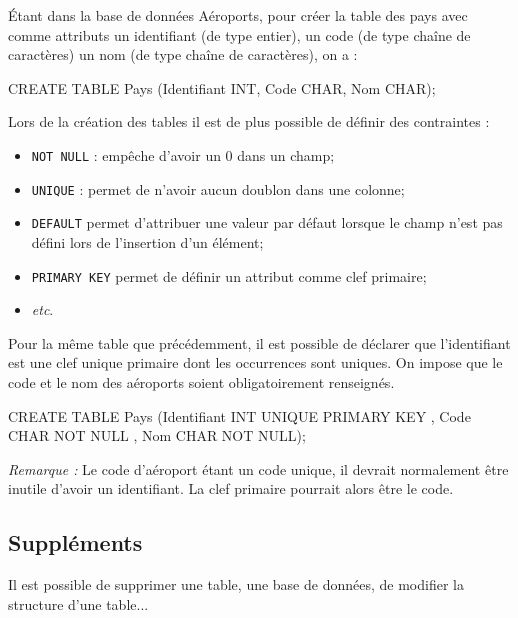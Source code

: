 \documentclass[10pt]{article}
\begin{document}
\begin{exemple}
Étant dans la base de données Aéroports, pour créer la table des pays avec comme attributs un identifiant (de type entier), un code (de type chaîne de caractères) un nom (de type chaîne de caractères), on a :
\begin{envsql}
\begin{sql}
CREATE TABLE Pays (Identifiant INT, Code CHAR, Nom CHAR);
\end{sql}
\end{envsql}

\end{exemple}

Lors de la création des tables il est de plus possible de définir des contraintes :
\begin{itemize}
\item \texttt{NOT NULL} : empêche d'avoir un 0 dans un champ;
\item \texttt{UNIQUE} : permet de n'avoir aucun doublon dans une colonne;
\item \texttt{DEFAULT} permet d'attribuer une valeur par défaut lorsque le champ n'est pas défini lors de l'insertion d'un élément;
\item \texttt{PRIMARY KEY} permet de définir un attribut comme clef primaire;
\item \textit{etc}.
\end{itemize}

\begin{exemple}
Pour la même table que précédemment, il est possible de déclarer que l'identifiant est une clef unique primaire dont les occurrences sont uniques. On impose que le code et le nom des aéroports soient obligatoirement renseignés.


\begin{envsql}
\begin{sql}
CREATE TABLE Pays (Identifiant INT UNIQUE PRIMARY KEY , Code CHAR NOT NULL , Nom CHAR NOT NULL);
\end{sql}
\end{envsql}
\textit{Remarque : } Le code d'aéroport étant un code unique, il devrait normalement être inutile d'avoir un identifiant. La clef primaire pourrait alors être le code. 

\end{exemple}

\subsection{Suppléments}
Il est possible de supprimer une table, une base de données, de modifier la structure d'une table...
\end{document}
